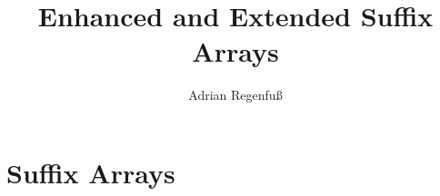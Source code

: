 \documentclass{article}
\title{Enhanced and Extended Suffix Arrays}
\author{Adrian Regenfuß}
\begin{document}
\maketitle

\section*{Suffix Arrays}
\end{document}
